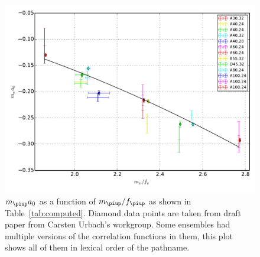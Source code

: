 \documentclass[11pt, english, fleqn, DIV=15, headinclude]{scrartcl}
\newcommand\mpi{m_{\piup}}
\begin{document}
\begin{figure}[htbp]
    \centering
    \includegraphics[width=\linewidth]{plots/result.pdf}
    \caption{%
        $\mpi a_0$ as a function of $\mpi/f_\piup$ as shown in
        Table~\ref{tab:computed}. Diamond data points are taken from draft
        paper from Carsten Urbach's workgroup. Some ensembles had multiple
        versions of the correlation functions in them, this plot shows all of
        them in lexical order of the pathname.
    }
    \label{fig:result}
\end{figure}
\end{document}
